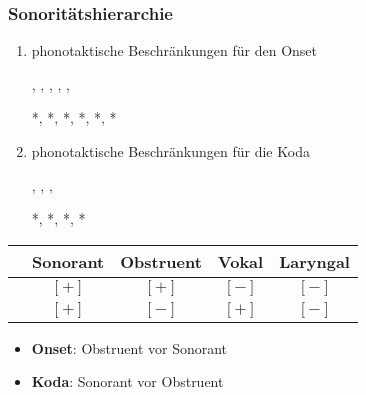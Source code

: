 \begin{frame}
\frametitle{Sonoritätshierarchie}

\begin{enumerate}
	\item phonotaktische Beschränkungen für den Onset
	
          \ea
          , , ,
          , , 
          \z

          \ea
          *, *, *, *, *, *
          \z

	\item phonotaktische Beschränkungen für die Koda

          \ea
          , , , 
          \z

          \ea
          *, *, *, *
          \z

\end{enumerate}
	

\begin{table}
\centering
\begin{tabular}{c|c|c|c|c} 
 & Sonorant & Obstruent & Vokal & Laryngal \\ 
\hline 
[kon] & $[+]$ & $[+]$ & $[-]$ & $[-]$ \\ 
\hline 
[son] & $[+]$ & $[-]$ & $[+]$ & $[-]$
\end{tabular} 

\end{table}

\begin{itemize}
	\item \textbf{Onset}: Obstruent vor Sonorant
	\item \textbf{Koda}: Sonorant vor Obstruent
\end{itemize}

\end{frame}




